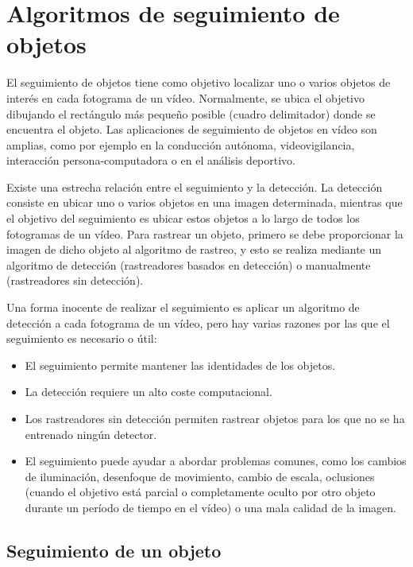 \section{Algoritmos de seguimiento de objetos}
\label{sec:tecnicas-utilizadas-tracking}

El seguimiento de objetos tiene como objetivo localizar uno o varios objetos de interés en cada fotograma de un vídeo. Normalmente, se ubica el objetivo dibujando el rectángulo más pequeño posible (cuadro delimitador) donde se encuentra el objeto. Las aplicaciones de seguimiento de objetos en vídeo son amplias, como por ejemplo en la conducción autónoma, videovigilancia, interacción persona-computadora o en el análisis deportivo.

Existe una estrecha relación entre el seguimiento y la detección. La detección consiste en ubicar uno o varios objetos en una imagen determinada, mientras que el objetivo del seguimiento es ubicar estos objetos a lo largo de todos los fotogramas de un vídeo. Para rastrear un objeto, primero se debe proporcionar la imagen de dicho objeto al algoritmo de rastreo, y esto se realiza mediante un algoritmo de detección (rastreadores basados en detección) o manualmente (rastreadores sin detección).

Una forma inocente de realizar el seguimiento es aplicar un algoritmo de detección a cada fotograma de un vídeo, pero hay varias razones por las que el seguimiento es necesario o útil:
\begin{itemize}
    \item El seguimiento permite mantener las identidades de los objetos.
    \item La detección requiere un alto coste computacional.
    \item Los rastreadores sin detección permiten rastrear objetos para los que no se ha entrenado ningún detector.
    \item El seguimiento puede ayudar a abordar problemas comunes, como los  cambios de iluminación, desenfoque de movimiento, cambio de escala, oclusiones (cuando el objetivo está parcial o completamente oculto por otro objeto durante un período de tiempo en el vídeo) o una mala calidad de la imagen.
\end{itemize}

\subsection{Seguimiento de un objeto}
\label{subsec:seguimiento-un-objeto}

